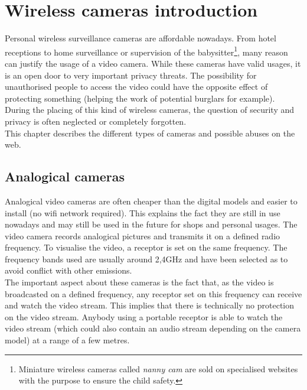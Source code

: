 
\chapter{Wireless cameras introduction}
\label{chap:wifi-cam}


Personal wireless surveillance cameras are affordable nowadays.
From hotel receptions to home surveillance or supervision of the babysitter\footnote{Miniature wireless cameras called \emph{nanny cam} are sold on specialised websites with the purpose to ensure the child safety.}, many reason can justify the usage of a video camera.
While these cameras have valid usages, it is an open door to very important privacy threats.
The possibility for unauthorised people to access the video could have the opposite effect of protecting something (helping the work of potential burglars for example).
During the placing of this kind of wireless cameras, the question of security and privacy is often neglected or completely forgotten.\\

This chapter describes the different types of cameras and possible abuses on the web.

\section{Analogical cameras}
\label{sec:cam-analogic}

Analogical video cameras are often cheaper than the digital models and easier to install (no wifi network required).
This explains the fact they are still in use nowadays and may still be used in the future for shops and personal usages.
The video camera records analogical pictures and transmits it on a defined radio frequency.
To visualise the video, a receptor is set on the same frequency.
The frequency bands used are usually around 2,4GHz and have been selected as to avoid conflict with other emissions.\\

The important aspect about these cameras is the fact that, as the video is broadcasted on a defined frequency, any receptor set on this frequency can receive and watch the video stream.
This implies that there is technically no protection on the video stream.
Anybody using a portable receptor is able to watch the video stream (which could also contain an audio stream depending on the camera model) at a range of a few metres.\\

